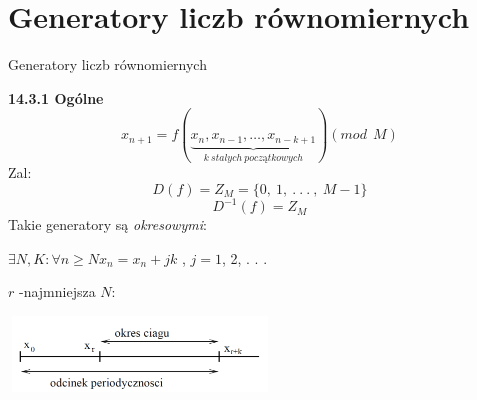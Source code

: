 \section{Generatory liczb równomiernych}
	\begin{frame}{Generatory liczb równomiernych}


	\textbf{14.3.1 Ogólne}
	\[          
	x_{n+1}=f(\underbrace{x_{n},x_{n-1},\ldots,x_{n-k+1}}_{k \:stalych\: początkowych}) (mod\ \ M) 
	\]
	Zal:
	$$
	D(f)=Z_{M}=\{0,\ 1,\ .\ .\ .\ ,\ M-1\}
	$$
	$$
	D^{-1}(f)=Z_{M}
	$$
	Takie generatory są {\it okresowymi}:
	\begin{center}
	$\exists N, K:\forall n\geq N x_{n}=x_{n}+jk$ , $j=1$, 2, . . .
	\end{center}
	$r$ -najmniejsza $N$:
    \begin{center}
	\includegraphics[width=70mm,height=20mm]{img/14/14_3_1_img}
	\end{center}
	\end{frame}
   	
